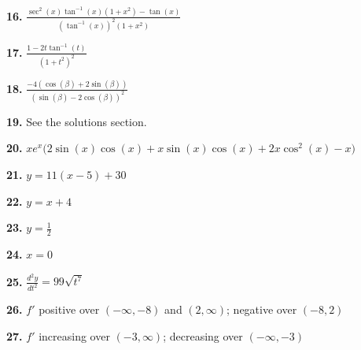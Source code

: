 \documentclass[12pt,]{book}
\theoremstyle{plain}
\theoremstyle{definition}
\numberwithin{equation}{section}
\newcommand{\fe}[2]{#1\mathopen{}\left(#2\right)\mathclose{}}
\newcommand{\ointerval}[2]{\left(#1,#2\right)}
\newcommand{\fd}[1]{#1'}
\newcommand{\lzn}[3]{\frac{d^{#1}#2}{d#3^{#1}}}
\begin{document}
                \par\smallskip
\noindent\textbf{16.}\quad{}
                    \(\frac{\fe{\sec^2}{x}\fe{\tan^{-1}}{x}\left(1+x^2\right)-\fe{\tan}{x}}{\left(\fe{\tan^{-1}}{x}\right)^2\left(1+x^2\right)}\)%

                \par\smallskip
\noindent\textbf{17.}\quad{}
                    \(\frac{1-2t\fe{\tan^{-1}}{t}}{\left(1+t^2\right)^2}\)%

                \par\smallskip
\noindent\textbf{18.}\quad{}
                    \(\frac{-4\left(\fe{\cos}{\beta}+2\fe{\sin}{\beta}\right)}{\left(\fe{\sin}{\beta}-2\fe{\cos}{\beta}\right)^2}\)%

                \par\smallskip
\noindent\textbf{19.}\quad{}
                    See the solutions section.%

                \par\smallskip
\noindent\textbf{20.}\quad{}
                     \(xe^x\big(2\fe{\sin}{x}\fe{\cos}{x}+x\fe{\sin}{x}\fe{\cos}{x}+2x\fe{\cos^2}{x}-x\big)\)%

                \par\smallskip
\noindent\textbf{21.}\quad{}
                    \(y=11(x-5)+30\)%

                \par\smallskip
\noindent\textbf{22.}\quad{}
                    \(y=x+4\)%

                \par\smallskip
\noindent\textbf{23.}\quad{}
                    \(y=\frac{1}{2}\)%

                \par\smallskip
\noindent\textbf{24.}\quad{}
                    \(x=0\)%

                \par\smallskip
\noindent\textbf{25.}\quad{}
                \(\lzn{2}{y}{t}=99\sqrt{t^7}\)%

            \par\smallskip
\noindent\textbf{26.}\quad{}
                    \(\fd{f}\) positive over \(\ointerval{-\infty}{-8}\) and \(\ointerval{2}{\infty}\); negative over \(\ointerval{-8}{2}\)%

                \par\smallskip
\noindent\textbf{27.}\quad{}
                    \(\fd{f}\) increasing over \(\ointerval{-3}{\infty}\); decreasing over \(\ointerval{-\infty}{-3}\)%
\end{document}
